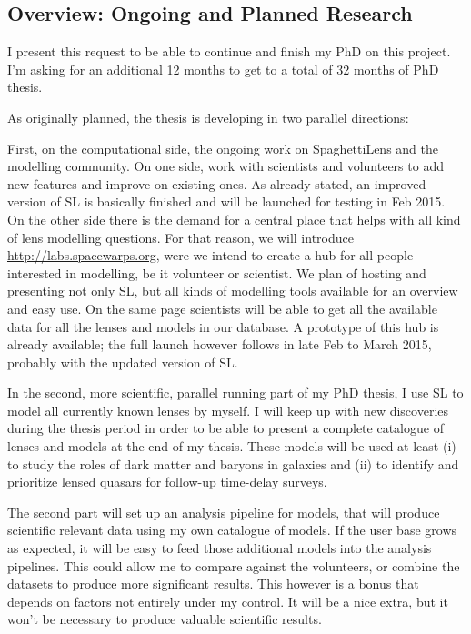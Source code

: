 \documentclass[11pt]{article}
\begin{document}
\subsection{Overview: Ongoing and Planned Research}

I present this request to be able to continue and finish my PhD on this project.
I'm asking for an additional 12 months to get to a total of 32 months of PhD thesis.

As originally planned, the thesis is developing in two parallel directions:

First, on the computational side, the ongoing work on SpaghettiLens and the modelling community.
On one side, work with scientists and volunteers to add new features and improve on existing ones.
As already stated, an improved version of SL is basically finished and will be launched for testing in Feb 2015.
On the other side there is the demand for a central place that helps with all kind of lens modelling questions.
For that reason, we will introduce \url{http://labs.spacewarps.org}, were we intend to create a hub for all people interested in modelling, be it volunteer or scientist.
We plan of hosting and presenting not only SL, but all kinds of modelling tools available for an overview and easy use.
On the same page scientists will be able to get all the available data for all the lenses and models in our database.
A prototype of this hub is already available; the full launch however follows in late Feb to March 2015, probably with the updated version of SL.


In the second, more scientific, parallel running part of my PhD thesis, I use SL to model all currently known lenses by myself.
I will keep up with new discoveries during the thesis period in order to be able to present a complete catalogue of lenses and models at the end of my thesis.
These models will be used at least (i) to study the roles of dark matter and baryons in galaxies and (ii) to identify and prioritize lensed quasars for follow-up time-delay surveys.

The second part will set up an analysis pipeline for models, that will produce scientific relevant data using my own catalogue of models.
If the user base grows as expected, it will be easy to feed those additional models into the analysis pipelines.
This could allow me to compare against the volunteers, or combine the datasets to produce more significant results.
This however is a bonus that depends on factors not entirely under my control.
It will be a nice extra, but it won't be necessary to produce valuable scientific results.
\end{document}
